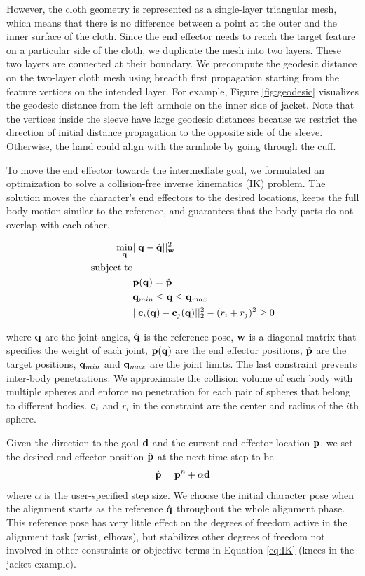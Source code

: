 However, the cloth geometry is represented as a single-layer triangular mesh, which means that there is no difference between a point at the outer and the inner surface of the cloth. Since the end effector needs to reach the target feature on a particular side of the cloth, we duplicate the mesh into two layers. These two layers are connected at their boundary. We precompute the geodesic distance on the two-layer cloth mesh using breadth first propagation starting from the feature vertices on the intended layer. For example, Figure \ref{fig:geodesic} visualizes the geodesic distance from the left armhole on the inner side of jacket. Note that the vertices inside the sleeve have large geodesic distances because we restrict the direction of initial distance propagation to the opposite side of the sleeve. Otherwise, the hand could align with the armhole by going through the cuff. 

To move the end effector towards the intermediate goal, we formulated an optimization to solve a collision-free inverse kinematics (IK) problem. The solution moves the character's end effectors to the desired locations, keeps the full body motion similar to the reference, and guarantees that the body parts do not overlap with each other.

\begin{align}
\label{eq:IK}
  \min_{\mathbf{q}} & ||\mathbf{q} - \hat{\mathbf{q}}||_{\mathbf{w}}^2 \\
  \nonumber  \mathrm{subject\;} \mathrm{to} & \\
  \nonumber  &\mathbf{p}(\mathbf{q}) = \hat{\mathbf{p}}\\
  \nonumber   &\mathbf{q}_{min} \leq \mathbf{q} \leq \mathbf{q}_{max}\\
  \nonumber   &||\mathbf{c}_i(\mathbf{q}) - \mathbf{c}_j(\mathbf{q})||_2^2 - (r_i + r_j)^2 \geq 0
\end{align}

where $\mathbf{q}$ are the joint angles, $\hat{\mathbf{q}}$ is the reference pose, $\mathbf{w}$ is a diagonal matrix that specifies the weight of each joint, $\mathbf{p}(\mathbf{q})$ are the end effector positions, $\hat{\mathbf{p}}$ are the target positions, $\mathbf{q}_{min}$ and $\mathbf{q}_{max}$ are the joint limits. The last constraint prevents inter-body penetrations. We approximate the collision volume of each body with multiple spheres and enforce no penetration for each pair of spheres that belong to different bodies. $\mathbf{c}_i$ and $r_i$ in the constraint are the center and radius of the $i$th sphere.

Given the direction to the goal $\mathbf{d}$ and the current end effector location $\mathbf{p}$, we set the desired end effector position $\hat{\mathbf{p}}$ at the next time step to be
\begin{equation}
  \hat{\mathbf{p}} = \mathbf{p}^n+\alpha\mathbf{d}
  \label{eq:target}
\end{equation}
where $\alpha$ is the user-specified step size. We choose the initial character pose when the alignment starts as the reference $\hat{\mathbf{q}}$ throughout the whole alignment phase. This reference pose has very little effect on the degrees of freedom active in the alignment task (\eg wrist, elbows), but stabilizes other degrees of freedom not involved in other constraints or objective terms in Equation \ref{eq:IK} (\eg knees in the jacket example).

